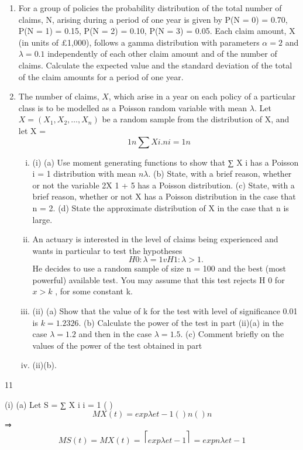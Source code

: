 \documentclass[a4paper,12pt]{article}
\begin{document}
\begin{enumerate}
\item For a group of policies the probability distribution of the total number of claims, N,
arising during a period of one year is given by
P(N = 0) = 0.70, P(N = 1) = 0.15, P(N = 2) = 0.10, P(N = 3) = 0.05.
Each claim amount, X (in units of £1,000), follows a gamma distribution with parameters $\alpha = 2$ and $\lambda = 0.1$ independently of each other claim amount and of the number of claims.
Calculate the expected value and the standard deviation of the total of the claim amounts for a period of one year.


\item The number of claims, $X$, which arise in a year on each policy of a particular class is to be modelled as a Poisson random variable with mean $\lambda$. Let $X = (X_1 , X_2 , \ldots, X_n )$ be a random sample from the distribution of X, and let X =
\[1 n
∑ X i .
n i = 1
n\]
\begin{enumerate}[(i)]
\item (i)
(a)
Use moment generating functions to show that
∑ X i has a Poisson
i = 1
distribution with mean $n\lambda$.
(b) State, with a brief reason, whether or not the variable 2X 1 + 5 has a Poisson distribution.
(c) State, with a brief reason, whether or not X has a Poisson distribution in the case that n = 2.
(d) State the approximate distribution of X in the case that n is large.
\item An actuary is interested in the level of claims being experienced and wants in particular to test the hypotheses
\[H 0 : \lambda = 1 v H 1 : \lambda > 1 .\]
He decides to use a random sample of size n = 100 and the best (most powerful) available test. You may assume that this test rejects H 0 for $x > k$ , for some constant k.
\item (ii)
(a) Show that the value of k for the test with level of significance 0.01 is $k = 1.2326$.
(b) Calculate the power of the test in part (ii)(a) in the case $\lambda = 1.2$ and then in the case $\lambda = 1.5$.
(c) Comment briefly on the values of the power of the test obtained in part
\item (ii)(b).
\end{enumerate}
\end{enumerate}
\newpage

11
\item (i)
(a)
Let S = ∑ X i
i = 1
{ (
) }
\[M X ( t ) = exp \lambda e t − 1
{ (
) }
n
{ (
) }
n\]
⇒ \[M S ( t ) = { M X ( t ) } = ⎡ exp \lambda e t − 1 ⎤ = exp n \lambda e t − 1\]
\end{document}
